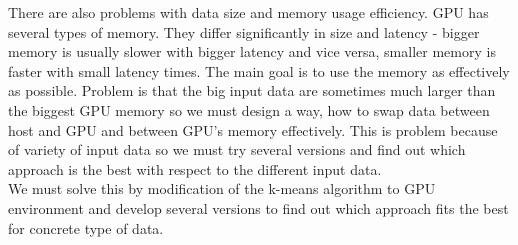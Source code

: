 There are also problems with data size and memory usage efficiency. GPU has several types of memory. They differ significantly in size and latency - bigger memory is usually slower with bigger latency and vice versa, smaller memory is faster with small latency times. The main goal is to use the memory as effectively as possible. Problem is that the big input data are sometimes much larger than the biggest GPU memory so we must design a way, how to swap data between host and GPU and between GPU's memory effectively. This is problem because of variety of input data so we must try several versions and find out which approach is the best with respect to the different input data.\\

We must solve this by modification of the k-means algorithm to GPU environment and develop several versions to find out which approach fits the best for concrete type of data.